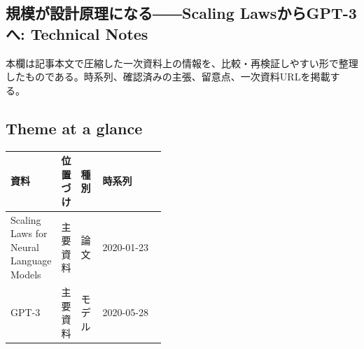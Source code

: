 \subsection*{規模が設計原理になる――Scaling LawsからGPT-3へ: Technical Notes}
本欄は記事本文で圧縮した一次資料上の情報を、比較・再検証しやすい形で整理したものである。時系列、確認済みの主張、留意点、一次資料URLを掲載する。
\smallskip
{}\par
\medskip
\subsection*{Theme at a glance}
\begin{center}
\footnotesize
\begin{tabularx}{\linewidth}{@{}p{0.20\linewidth}p{0.10\linewidth}p{0.14\linewidth}X@{}}
\toprule
資料 & 位置づけ & 種別 & 時系列 \\
\midrule
Scaling Laws for Neural Language Models & 主要資料 & 論文 & 2020-01-23 \\
GPT-3 & 主要資料 & モデル & 2020-05-28 \\
\bottomrule
\end{tabularx}
\end{center}
\normalsize

